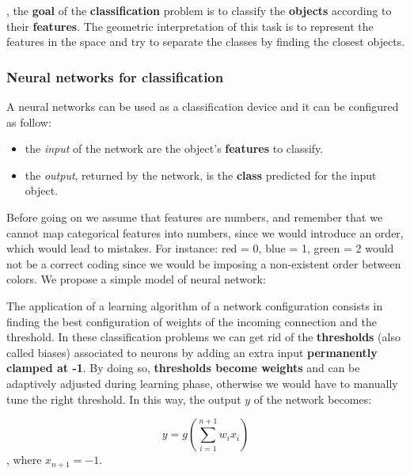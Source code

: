 , the \textbf{goal} of the \textbf{classification} problem is to classify the \textbf{objects} according to their \textbf{features}. The geometric interpretation of this task is to represent the features in the space and try to separate the classes by finding the closest objects.


\subsubsection{Neural networks for classification}

A neural networks can be used as a classification device and it can be configured as follow:

\begin{itemize}

	\item the \textit{input} of the network are the object's \textbf{features} to classify.
 
	\item the \textit{output}, returned by the network, is the \textbf{class} predicted for the input object.
 
\end{itemize}

Before going on we assume that features are numbers, and remember that we cannot map categorical features into numbers, since we would introduce an order, which would lead to mistakes. For instance: red = 0, blue = 1, green = 2 would not be a correct coding since we would be imposing a non-existent order between colors. We propose a simple model of neural network:


The application of a learning algorithm of a network configuration consists in finding the best configuration of weights of the incoming connection and the threshold. In these classification problems we can get rid of the \textbf{thresholds} (also called biases) associated to neurons by adding an extra input \textbf{permanently clamped at -1}. By doing so,\textbf{ thresholds become weights} and can be adaptively adjusted during learning phase, otherwise we would have to manually tune the right threshold. In this way, the output $y$ of the network becomes:

$$
y = g\left(\sum\limits_{i = 1}^{n+1} w_ix_i\right)
$$
, where $x_{n+1} = -1$.

